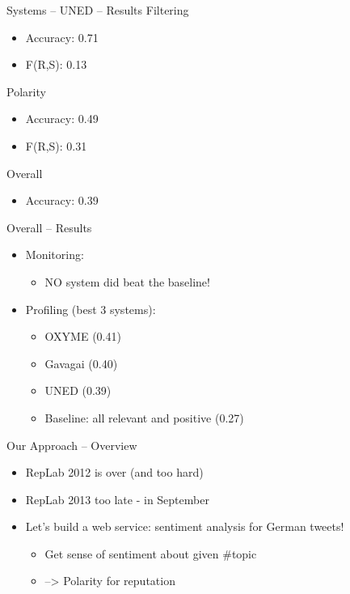 \documentclass[12pt,a4paper]{beamer}
\begin{document}
\begin{frame}{Systems -- UNED -- Results}
Filtering
\begin{itemize}
\item Accuracy: 0.71
\item F(R,S): 0.13
\end{itemize}
Polarity
\begin{itemize}
\item Accuracy: 0.49 
\item F(R,S): 0.31
\end{itemize}
Overall
\begin{itemize}
\item Accuracy: 0.39
\end{itemize}

\end{frame}


\begin{frame}{Overall -- Results}
\begin{itemize}
\item Monitoring:
\begin{itemize}
\item NO system did beat the baseline!
\end{itemize}
\item Profiling (best 3 systems):
\begin{itemize}
\item OXYME (0.41)
\item Gavagai (0.40)
\item UNED (0.39)
\item Baseline: all relevant and positive (0.27)
\end{itemize}
\end{itemize}
\end{frame}

\begin{frame}{Our Approach -- Overview}
\begin{itemize}
\item RepLab 2012 is over (and too hard)
\item RepLab 2013 too late - in September
\item Let's build a web service: sentiment analysis for German tweets!
  \begin{itemize}
  \item Get sense of sentiment about given \#topic
  \item --> Polarity for reputation
  \end{itemize}
\end{itemize}
\end{frame}
\end{document}
